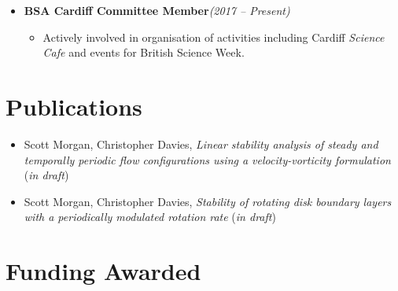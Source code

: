 \documentclass[10pt,a4paper,sans]{moderncv}        %
\begin{document}
\begin{itemize}
		\vspace{6pt}
		
		\item{\textbf{BSA Cardiff Committee Member}\hfill \textit{(2017 -- Present)}
			
			\vspace{4pt}
			
			\small{
				\begin{itemize}	
					\item Actively involved in organisation of activities including Cardiff \textit{Science Cafe} and events for British Science Week.
				\end{itemize}
		}}
		
	\end{itemize}
	
	\vspace{10pt}
	
	\section{Publications}
	
	\vspace{10pt}
	
	\begin{itemize}
		\item Scott Morgan, Christopher Davies, \textit{Linear stability analysis of steady and temporally periodic flow configurations using a velocity-vorticity formulation} (\textit{in draft})
		
		\vspace{6pt}
		
		\item Scott Morgan, Christopher Davies, \textit{Stability of rotating disk boundary layers with a periodically modulated rotation rate} (\textit{in draft})
	\end{itemize}
	
	\vspace{10pt}
	
	\section{Funding Awarded}
		
		\vspace{8pt}
		
\end{document}
